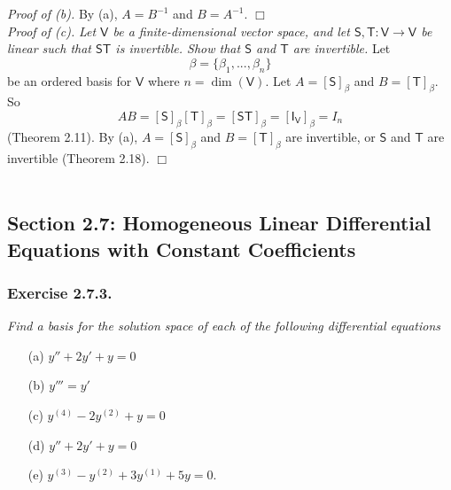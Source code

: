 \documentclass{article}
\begin{document}
\emph{Proof of (b).}
By (a), $A = B^{-1}$ and $B = A^{-1}$.
$\Box$ \\

\emph{Proof of (c).}
\emph{Let $\mathsf{V}$ be a finite-dimensional vector space,
and let $\mathsf{S}, \mathsf{T}: \mathsf{V} \to \mathsf{V}$ be linear
such that $\mathsf{S}\mathsf{T}$ is invertible.
Show that $\mathsf{S}$ and $\mathsf{T}$ are invertible.}
Let
$$\beta = \{ \beta_1, ..., \beta_n \}$$
be an ordered basis for $\mathsf{V}$ where $n = \dim(\mathsf{V})$.
Let $A = [\mathsf{S}]_\beta$ and $B = [\mathsf{T}]_\beta$.
So
$$AB
= [\mathsf{S}]_\beta [\mathsf{T}]_\beta
= [\mathsf{S} \mathsf{T}]_\beta
= [\mathsf{I}_{\mathsf{V}} ]_\beta = I_n$$ (Theorem 2.11).
By (a), $A = [\mathsf{S}]_\beta$ and $B = [\mathsf{T}]_\beta$ are invertible,
or $\mathsf{S}$ and $\mathsf{T}$ are invertible (Theorem 2.18).
$\Box$ \\\\






\subsection*{Section 2.7: Homogeneous Linear Differential Equations
with Constant Coefficients \\}



\subsubsection*{Exercise 2.7.3.}
\emph{Find a basis for the solution space of each of the following differential
equations}
\begin{enumerate}
\item[(a)]
$y''+2y'+y = 0$
\item[(b)]
$y'''=y'$
\item[(c)]
$y^{(4)} - 2y^{(2)} + y = 0$
\item[(d)]
$y''+2y'+y = 0$
\item[(e)]
$y^{(3)} - y^{(2)} + 3y^{(1)} + 5y = 0$. \\
\end{enumerate}
\end{document}
